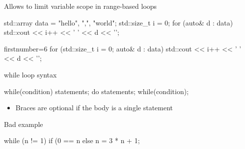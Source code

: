 \begin{frame}[fragile]
  \begin{block}{}
    Allows to limit variable scope in range-based loops
  \end{block}
  \begin{alertblock}{}
    \begin{cppcode*}{}
      std::array data = {"hello", ",", "world"};
      std::size_t i = 0;
      for (auto& d : data) {
        std::cout << i++ << ' ' << d << '\n';
      }
    \end{cppcode*}
  \end{alertblock}
  \begin{exampleblock}{}
    \begin{cppcode*}{firstnumber=6}
      for (std::size_t i = 0; auto& d : data) {
        std::cout << i++ << ' ' << d << '\n';
      }
    \end{cppcode*}
  \end{exampleblock}
\end{frame}

\begin{frame}[fragile]
  \begin{block}{while loop syntax}
    \begin{cppcode*}{}
      while(condition) {
        statements;
      }
      do {
        statements;
      } while(condition);
    \end{cppcode*}
    \begin{itemize}
      \item Braces are optional if the body is a single statement
    \end{itemize}
  \end{block}
  \pause
  \begin{alertblock}{Bad example}
    \begin{cppcode*}{}
      while (n != 1)
        if (0 == n%
        else n = 3 * n + 1;
    \end{cppcode*}
  \end{alertblock}
\end{frame}

